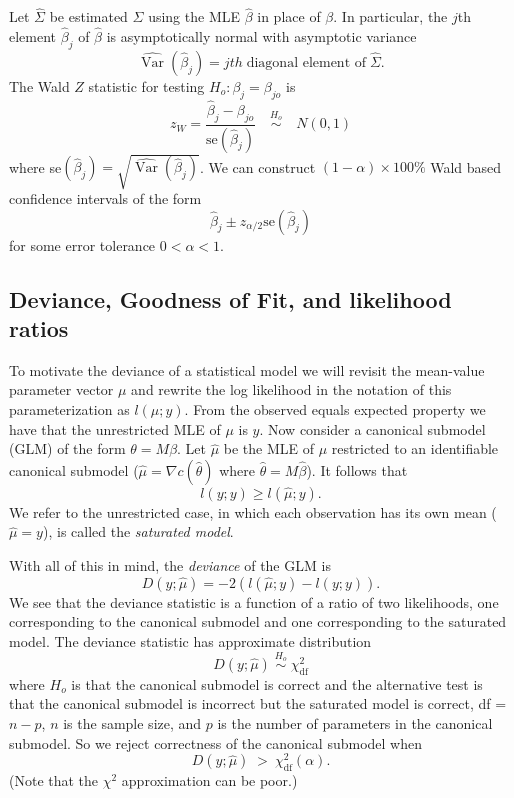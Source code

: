 \documentclass[12pt]{article}
\DeclareMathOperator{\Var}{Var}
\begin{document}
Let $\widehat\Sigma$ be estimated $\Sigma$ using the MLE $\hat\beta$ in place of $\beta$. In particular, the $j$th element $\hat\beta_j$ of $\hat\beta$ is asymptotically normal with asymptotic variance
$$
  \widehat{\Var}(\hat\beta_j) = jth \; \text{diagonal element of} \; \widehat\Sigma.
$$
The Wald $Z$ statistic for testing $H_o:\beta_j = \beta_{jo}$ is 
$$
  z_W = \frac{\hat\beta_j - \beta_{jo}}{\text{se}(\hat\beta_j)} \quad \overset{H_o}{\sim} \quad N(0,1)
$$
where se$(\hat\beta_j) = \sqrt{\widehat{\Var}(\hat\beta_j)}$. We can construct $(1-\alpha)\times 100\%$ Wald based confidence intervals of the form
$$
  \hat\beta_j \pm z_{\alpha/2}\text{se}(\hat\beta_j)
$$
for some error tolerance $0 < \alpha < 1$.


\subsection*{Deviance, Goodness of Fit, and likelihood ratios}

To motivate the deviance of a statistical model we will revisit the mean-value parameter vector $\mu$ and rewrite the log likelihood in the notation of this parameterization as $l(\mu;y)$. From the observed equals expected property we have that the unrestricted MLE of $\mu$ is $y$. Now consider a canonical submodel (GLM) of the form $\theta = M\beta$. Let $\hat\mu$ be the MLE of $\mu$ restricted to an identifiable canonical submodel ($\hat{\mu} = \nabla c(\hat\theta)$ where $\hat\theta = M\hat\beta$). It follows that
$$
  l(y;y) \geq l(\hat\mu; y).
$$
We refer to the unrestricted case, in which each observation has its own mean ($\hat\mu = y$), is called the \emph{saturated model}.

With all of this in mind, the \emph{deviance} of the GLM is
$$
  D(y;\hat\mu) = -2\left(l(\hat\mu;y) - l(y;y)\right).
$$
We see that the deviance statistic is a function of a ratio of two likelihoods, one corresponding to the canonical submodel and one corresponding to the saturated model. The deviance statistic has approximate distribution
$$
  D(y;\hat\mu) \; \overset{H_o}{\sim} \; \chi^2_{\text{df}}
$$
where $H_o$ is that the canonical submodel is correct and the alternative test is that the canonical submodel is incorrect but the saturated model is correct, df = $n - p$, $n$ is the sample size, and $p$ is the number of parameters in the canonical submodel. So we reject correctness of the canonical submodel when
$$
  D(y;\hat\mu) \; > \: \chi^2_{\text{df}}(\alpha).
$$
(Note that the $\chi^2$ approximation can be poor.)
\end{document}
